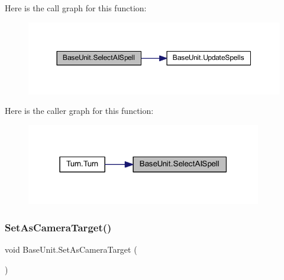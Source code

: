 Here is the call graph for this function\+:\nopagebreak
\begin{figure}[H]
\begin{center}
\leavevmode
\includegraphics[width=350pt]{class_base_unit_a94ba01b61de9b22ba2431a47caf13cd5_cgraph}
\end{center}
\end{figure}
Here is the caller graph for this function\+:\nopagebreak
\begin{figure}[H]
\begin{center}
\leavevmode
\includegraphics[width=291pt]{class_base_unit_a94ba01b61de9b22ba2431a47caf13cd5_icgraph}
\end{center}
\end{figure}
\mbox{\label{class_base_unit_ac4b2eaeb4641fc124d36d413b6193c56}} 
\subsubsection{\texorpdfstring{SetAsCameraTarget()}{SetAsCameraTarget()}}
{\footnotesize\ttfamily void Base\+Unit.\+Set\+As\+Camera\+Target (\begin{DoxyParamCaption}{ }\end{DoxyParamCaption})}


